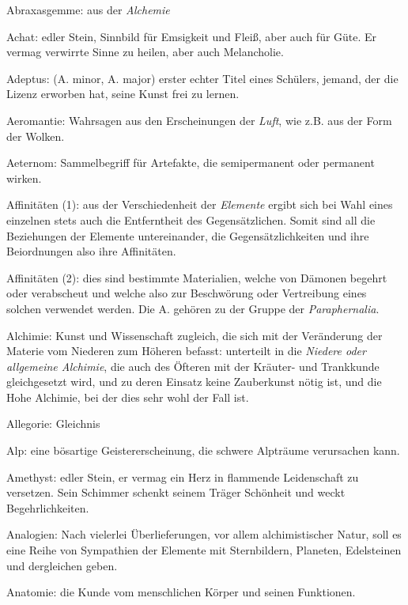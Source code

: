 \documentclass[a5paper,8pt]{book}
\begin{document}
\begin{small}

\begin{description}

  \item Abraxasgemme: aus der \textit{Alchemie}\
 \item Achat: edler Stein, Sinnbild für Emsigkeit und Fleiß, aber auch für Güte. Er vermag verwirrte Sinne zu heilen, aber auch Melancholie.\
 \item Adeptus: (A. minor, A. major) erster echter Titel eines Schülers, jemand, der die Lizenz erworben hat, seine Kunst frei zu lernen.\
 \item Aeromantie: Wahrsagen aus den Erscheinungen der \textit{Luft}, wie z.B. aus der Form der Wolken.\
 \item Aeternom: Sammelbegriff für Artefakte, die semipermanent oder permanent wirken.\
 \item Affinitäten (1): aus der Verschiedenheit der \textit{Elemente} ergibt sich bei Wahl eines einzelnen stets auch die 
Entferntheit des Gegensätzlichen. Somit sind all die Beziehungen der Elemente untereinander, die Gegensätzlichkeiten und 
ihre Beiordnungen also ihre Affinitäten.\
 \item Affinitäten (2): dies sind bestimmte Materialien, welche von Dämonen begehrt oder verabscheut und welche also zur 
Beschwörung oder Vertreibung eines solchen verwendet werden. Die A. gehören zu der Gruppe der \textit{Paraphernalia}.
 \item Alchimie: Kunst und Wissenschaft zugleich, die sich mit der Veränderung der Materie vom Niederen zum Höheren befasst: 
unterteilt in die \textit{Niedere oder allgemeine Alchimie}, die auch des Öfteren mit der Kräuter- und Trankkunde gleichgesetzt wird, und zu deren Einsatz keine Zauberkunst nötig ist, und die \textit{}Hohe Alchimie, bei der dies sehr wohl der Fall ist.
 \item Allegorie: Gleichnis
 \item Alp: eine bösartige Geistererscheinung, die schwere Alpträume verursachen kann.
 \item Amethyst: edler Stein, er vermag ein Herz in flammende Leidenschaft zu versetzen. Sein Schimmer schenkt seinem Träger Schönheit und weckt Begehrlichkeiten.
 \item Analogien: Nach vielerlei Überlieferungen, vor allem alchimistischer Natur, soll es eine Reihe von Sympathien der Elemente mit Sternbildern, Planeten, Edelsteinen und dergleichen geben.
 \item Anatomie: die Kunde vom menschlichen Körper und seinen Funktionen.

\end{description}
\end{small}
\end{document}
